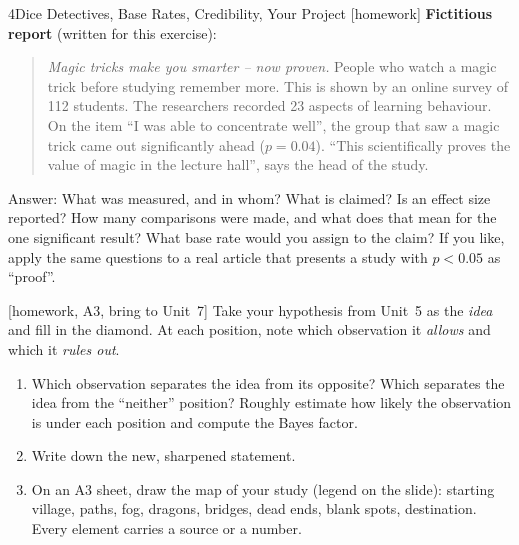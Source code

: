 \begin{uebungsblattb}{4}{Dice Detectives, Base Rates, Credibility, Your Project}
[homework]
\textbf{Fictitious report} (written for this exercise):

\begin{quote}\small
\emph{Magic tricks make you smarter -- now proven.} People who watch a
magic trick before studying remember more. This is shown by an online
survey of 112 students. The researchers recorded 23 aspects of learning
behaviour. On the item \enquote{I was able to concentrate well}, the group
that saw a magic trick came out significantly ahead ($p = 0.04$).
\enquote{This scientifically proves the value of magic in the lecture
hall}, says the head of the study.
\end{quote}
Answer: What was measured, and in whom? What is claimed? Is an effect
size reported? How many comparisons were made, and what does that mean
for the one significant result? What base rate would you assign to the
claim? If you like, apply the same questions to a real article that
presents a study with $p<0.05$ as \enquote{proof}.

[homework, A3, bring to Unit~7]
Take your hypothesis from Unit~5 as the \emph{idea} and fill in the
diamond. At each position, note which observation it \emph{allows} and
which it \emph{rules out}.

\begin{center}
\end{center}
\begin{enumerate}
  \item Which observation separates the idea from its opposite? Which
    separates the idea from the \enquote{neither} position? Roughly
    estimate how likely the observation is under each position and
    compute the Bayes factor.
  \item Write down the new, sharpened statement.
  \item On an A3 sheet, draw the map of your study (legend on the slide):
    starting village, paths, fog, dragons, bridges, dead ends, blank
    spots, destination. Every element carries a source or a number.
\end{enumerate}


\end{uebungsblattb}
